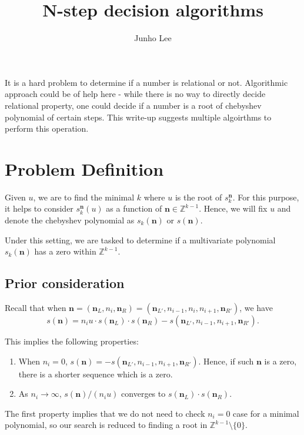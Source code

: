 \documentclass{article}
\title{N-step decision algorithms}
\author{Junho Lee}
\theoremstyle{definition}
\theoremstyle{plain}
\theoremstyle{remark}
\numberwithin{equation}{section}
\newcommand{\integer}{\mathbb{Z}}
\begin{document}
\pagecolor{white}
\color{black}
\maketitle

It is a hard problem to determine if a number is relational or not.
Algorithmic approach could be of help here -
while there is no way to directly decide relational property,
one could decide if a number is a root of chebyshev polynomial of certain steps.
This write-up suggests multiple algoirthms to perform this operation.

\section{Problem Definition}

Given $u$, we are to find the minimal $k$ where $u$ is the root of $s^{\mathbf{n}}_k$.
For this purpose, it helps to consider $s^{\mathbf{n}}_k(u)$ as a function of $\mathbf{n} \in \integer^{k-1}$.
Hence, we will fix $u$ and denote the chebyshev polynomial as $s_k(\mathbf{n})$ or $s(\mathbf{n})$.

Under this setting, we are tasked to determine if a multivariate polynomial $s_k(\mathbf{n})$
has a zero within $\integer^{k-1}$.

\subsection{Prior consideration}

Recall that when $\mathbf{n} = (\mathbf{n}_L, n_i, \mathbf{n}_R)
  = (\mathbf{n}_{L'}, n_{i-1}, n_i, n_{i+1}, \mathbf{n}_{R'})$,
we have
\begin{equation}\label{key_equation}
  s(\mathbf{n}) =
  n_i u \cdot s(\mathbf{n}_L) \cdot s(\mathbf{n}_R)
  - s(\mathbf{n}_{L'}, n_{i-1}, n_{i+1}, \mathbf{n}_{R'}).
\end{equation}

This implies the following properties:
\begin{enumerate}
  \item When $n_i = 0$, $s(\mathbf{n}) = - s(\mathbf{n}_{L'}, n_{i-1}, n_{i+1}, \mathbf{n}_{R'})$.
  Hence, if such $\mathbf{n}$ is a zero, there is a shorter sequence which is a zero.
  \item As $n_i \to \infty$, $s(\mathbf{n}) / (n_i u)$ converges to $s(\mathbf{n}_L) \cdot s(\mathbf{n}_R)$.
\end{enumerate}

The first property implies that we do not need to check $n_i = 0$ case for a minimal polynomial,
so our search is reduced to finding a root in $\integer^{k-1} \setminus \{0\}$.
\end{document}
